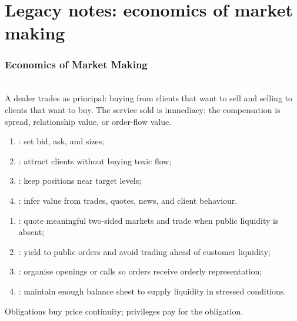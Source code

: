 \documentclass[a4paper,oneside,openany]{book}
\begin{document}
\chapter*{Legacy notes: economics of market making}

\subsection*{Economics of Market Making}

\begin{definition} \\
A dealer trades as principal: buying from clients that want to sell and selling to clients that want to buy. The service sold is immediacy; the compensation is spread, relationship value, or order-flow value.
\end{definition}

\begin{taxonomy} 
\begin{enumerate}[label=\roman*.]
\setlength{\itemsep}{0pt}
\item {}: set bid, ask, and sizes;
\item {}: attract clients without buying toxic flow;
\item {}: keep positions near target levels;
\item {}: infer value from trades, quotes, news, and client behaviour.
\end{enumerate}
\end{taxonomy}

\begin{taxonomy} 
\begin{enumerate}[label=\roman*.]
\setlength{\itemsep}{0pt}
\item {}: quote meaningful two-sided markets and trade when public liquidity is absent;
\item {}: yield to public orders and avoid trading ahead of customer liquidity;
\item {}: organise openings or calls so orders receive orderly representation;
\item {}: maintain enough balance sheet to supply liquidity in stressed conditions.
\end{enumerate}
Obligations buy price continuity; privileges pay for the obligation.
\end{taxonomy}
\end{document}
